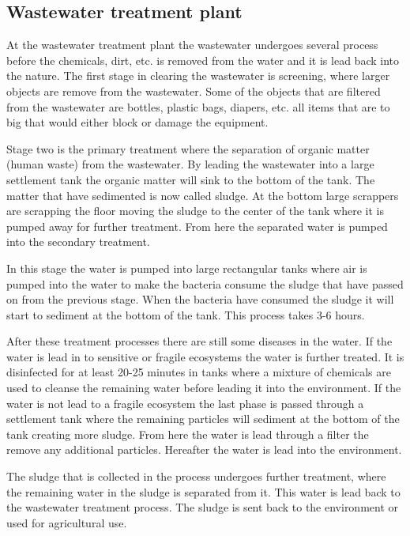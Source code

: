 
\subsection{Wastewater treatment plant}\label{subse:Wastewater treatment plant}
At the wastewater treatment plant the wastewater undergoes several process before the chemicals, dirt, etc. is removed from the water and it is lead back into the nature. The first stage in clearing the wastewater is screening, where larger objects are remove from the wastewater. Some of the objects that are filtered from the wastewater are bottles, plastic bags, diapers, etc. all items that are to big that would either block or damage the equipment. 

Stage two is the primary treatment where the separation of organic matter (human waste) from the wastewater. By leading the wastewater into a large settlement tank the organic matter will sink to the bottom of the tank. The matter that have sedimented is now called sludge. At the bottom large scrappers are scrapping the floor moving the sludge to the center of the tank where it is pumped away for further treatment. From here the separated water is pumped into the secondary treatment. 

In this stage the water is pumped into large rectangular tanks where air is pumped into the water to make the bacteria consume the sludge that have passed on from the previous stage. When the bacteria have consumed the sludge it will start to sediment at the bottom of the tank. This process takes 3-6 hours.  

After these treatment processes there are still some diseases in the water. If the water is lead in to sensitive or fragile ecosystems the water is further treated. It is disinfected for at least 20-25 minutes in tanks where a mixture of chemicals are used to cleanse the remaining water before leading it into the environment. If the water is not lead to a fragile ecosystem the last phase is passed through a settlement tank where the remaining particles will sediment at the bottom of the tank creating more sludge. From here the water is lead through a filter the remove any additional particles. Hereafter the water is lead into the environment. 

The sludge that is collected in the process undergoes further treatment, where the remaining water in the sludge is separated from it. This water is lead back to the wastewater treatment process. The sludge is sent back to the environment or used for agricultural use.





